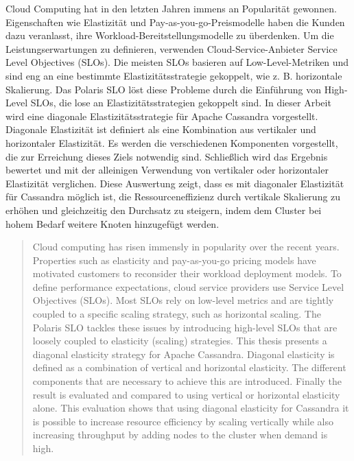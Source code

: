 \begin{kurzfassung}

Cloud Computing hat in den letzten Jahren immens an Popularität gewonnen. Eigenschaften wie Elastizität und Pay-as-you-go-Preismodelle haben die Kunden dazu veranlasst, ihre Workload-Bereitstellungsmodelle zu überdenken. Um die Leistungserwartungen zu definieren, verwenden Cloud-Service-Anbieter Service Level Objectives (SLOs). Die meisten SLOs basieren auf Low-Level-Metriken und sind eng an eine bestimmte Elastizitätsstrategie gekoppelt, wie z. B. horizontale Skalierung. Das Polaris SLO löst diese Probleme durch die Einführung von High-Level SLOs, die lose an Elastizitätsstrategien gekoppelt sind. In dieser Arbeit wird eine diagonale Elastizitätsstrategie für Apache Cassandra vorgestellt. Diagonale Elastizität ist definiert als eine Kombination aus vertikaler und horizontaler Elastizität. Es werden die verschiedenen Komponenten vorgestellt, die zur Erreichung dieses Ziels notwendig sind. Schließlich wird das Ergebnis bewertet und mit der alleinigen Verwendung von vertikaler oder horizontaler Elastizität verglichen. Diese Auswertung zeigt, dass es mit diagonaler Elastizität für Cassandra möglich ist, die Ressourceneffizienz durch vertikale Skalierung zu erhöhen und gleichzeitig den Durchsatz zu steigern, indem dem Cluster bei hohem Bedarf weitere Knoten hinzugefügt werden.

\end{kurzfassung}

\begin{abstract}

Cloud computing has risen immensly in popularity over the recent years. Properties such as elasticity and pay-as-you-go pricing models have motivated customers to reconsider their workload deployment models. To define performance expectations, cloud service providers use Service Level Objectives (SLOs). Most SLOs rely on low-level metrics and are tightly coupled to a specific scaling strategy, such as horizontal scaling. The Polaris SLO tackles these issues by introducing high-level SLOs that are loosely coupled to elasticity (scaling) strategies. This thesis presents a diagonal elasticity strategy for Apache Cassandra. Diagonal elasticity is defined as a combination of vertical and horizontal elasticity. The different components that are necessary to achieve this are introduced. Finally the result is evaluated and compared to using vertical or horizontal elasticity alone. This evaluation shows that using diagonal elasticity for Cassandra it is possible to increase resource efficiency by scaling vertically while also increasing throughput by adding nodes to the cluster when demand is high.

\end{abstract}
